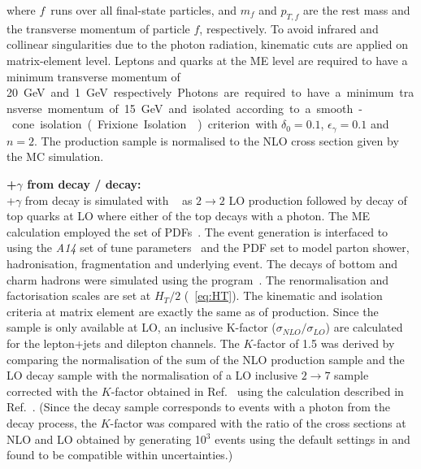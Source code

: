 where $f$~runs over all final-state particles, and $m_f$ and $p_{T,f}$ are the rest mass and the transverse momentum of particle $f$, respectively. To avoid infrared and collinear singularities due to the photon radiation, kinematic cuts are applied on matrix-element level. Leptons and quarks at the ME level are required to have a minimum transverse momentum of \SI{20} GeV and \SI{1} GeV respectively. Photons are required to have a minimum transverse momentum of 15 GeV and isolated according to a smooth-cone isolation (Frixione Isolation~\cite{Frixione:1998jh}) criterion with $\delta_0=0.1$, $\epsilon_{\gamma}=0.1$ and $n=2$. The \tty production sample is normalised to the NLO cross section given by the MC simulation.

\textbf{\ttbar+$\gamma$ from decay / \tty decay:}\\
\ttbar+$\gamma$ from decay is simulated with \MGNLO[2.7.3]~\cite{Alwall:2014hca} as $2 \to 2$ LO \ttbar production followed by decay of top quarks at LO where either of the top decays with a photon. The ME calculation employed the \NNPDF[3.0nlo] set of PDFs~\cite{Ball:2014uwa}. The event generation is interfaced to \PYTHIA[8.240]~\cite{Sjostrand:2007gs} using the \emph{A14} set of tune parameters~\cite{ATL-PHYS-PUB-2014-021} and the \nnpdflo PDF set to model parton shower, hadronisation, fragmentation and underlying event. The decays of bottom and charm hadrons were simulated using the \EVTGEN[1.6.0] program~\cite{Lange:2001uf}. The renormalisation and factorisation scales are set at $H_{T}/2$ (~\cref{eq:HT}). The kinematic and isolation criteria at matrix element are exactly the same as of \tty production. Since the sample is only available at LO, an inclusive K-factor ($\sigma_{NLO}/\sigma_{LO}$) are calculated for the lepton+jets and dilepton channels. The $K$-factor of 1.5 was derived by comparing the normalisation of the sum of the NLO \tty production sample and the LO \tty decay sample with the normalisation of a LO inclusive $2 \to 7$ \tty sample corrected with the $K$-factor obtained in Ref.~\cite{TOPQ-2017-14} using the calculation described in Ref.~\cite{Melnikov:2011ta}. (Since the \tty decay sample corresponds to \ttbar events with a photon from the decay process, the $K$-factor was compared with the ratio of the \ttbar cross sections at NLO and LO obtained by generating 10$^3$ events using the default settings in \MGNLO and found to be compatible within uncertainties.)


